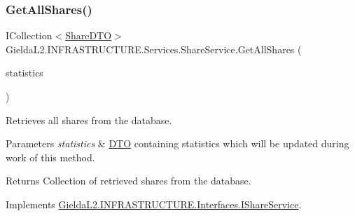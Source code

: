 \mbox{\label{class_gielda_l2_1_1_i_n_f_r_a_s_t_r_u_c_t_u_r_e_1_1_services_1_1_share_service_adfa90ea57786eddc34961f73e6eadc23}} 
\subsubsection{\texorpdfstring{GetAllShares()}{GetAllShares()}}
{\footnotesize\ttfamily I\+Collection$<$\mbox{\hyperlink{class_gielda_l2_1_1_i_n_f_r_a_s_t_r_u_c_t_u_r_e_1_1_d_t_o_1_1_share_d_t_o}{Share\+D\+TO}}$>$ Gielda\+L2.\+I\+N\+F\+R\+A\+S\+T\+R\+U\+C\+T\+U\+R\+E.\+Services.\+Share\+Service.\+Get\+All\+Shares (\begin{DoxyParamCaption}\item[{\mbox{\hyperlink{class_gielda_l2_1_1_i_n_f_r_a_s_t_r_u_c_t_u_r_e_1_1_d_t_o_1_1_statistics_d_t_o}{Statistics\+D\+TO}}}]{statistics }\end{DoxyParamCaption})}



Retrieves all shares from the database. 


\begin{DoxyParams}{Parameters}
{\em statistics} & \mbox{\hyperlink{namespace_gielda_l2_1_1_i_n_f_r_a_s_t_r_u_c_t_u_r_e_1_1_d_t_o}{D\+TO}} containing statistics which will be updated during work of this method.\\
\hline
\end{DoxyParams}
\begin{DoxyReturn}{Returns}
Collection of retrieved shares from the database.
\end{DoxyReturn}


Implements \mbox{\hyperlink{interface_gielda_l2_1_1_i_n_f_r_a_s_t_r_u_c_t_u_r_e_1_1_interfaces_1_1_i_share_service_a20dc5464bf3cb349f9b8f70cc69c1ae8}{Gielda\+L2.\+I\+N\+F\+R\+A\+S\+T\+R\+U\+C\+T\+U\+R\+E.\+Interfaces.\+I\+Share\+Service}}.

\mbox{\label{class_gielda_l2_1_1_i_n_f_r_a_s_t_r_u_c_t_u_r_e_1_1_services_1_1_share_service_a969e5f377b0d726ea6b891d9c42315b6}} 
